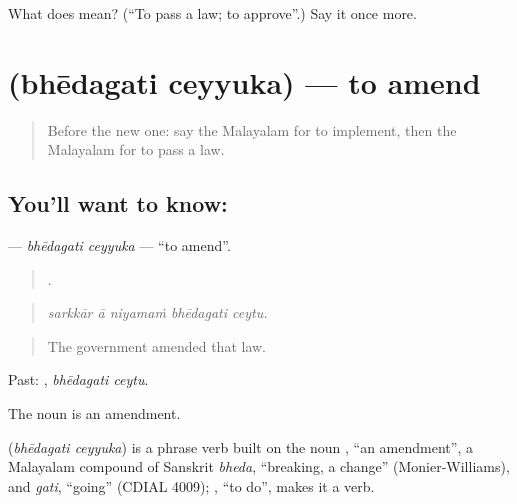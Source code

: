 \begin{tcolorbox}[breakable,colback=teal!4,colframe=teal!35!black,title={Before you move on}]
What does  mean? (\textquotedblleft{}To pass a law; to approve\textquotedblright{}.) Say it once more.
\end{tcolorbox}
\section[\texorpdfstring{\ml{ഭേദഗതി} \ml{ചെയ്യുക} (bhēdagati ceyyuka)}{ഭേദഗതി ചെയ്യുക (bhēdagati ceyyuka)}]{  (bhēdagati ceyyuka) — to amend}

\label{lesson:ML-C423-bhedagati-ceyyuka}



\begin{quote}
Before the new one: say the Malayalam for to implement, then the Malayalam for to pass a law.
\end{quote}

\subsection*{You'll want to know:  }
\textbf{ } — \emph{bhēdagati ceyyuka} — \textquotedblleft{}to amend\textquotedblright{}.

\begin{quote}
    .
\end{quote}

\begin{quote}
\emph{sarkkār ā niyamaṁ bhēdagati ceytu.}
\end{quote}

\begin{quote}
The government amended that law.
\end{quote}

Past:  , \emph{bhēdagati ceytu}.

The noun  is an amendment.

\begin{cousinweb}
\textbf{ } (\emph{bhēdagati ceyyuka}) is a phrase verb built on the noun , \textquotedblleft{}an amendment\textquotedblright{}, a Malayalam compound of Sanskrit \emph{bheda}, \textquotedblleft{}breaking, a change\textquotedblright{} (Monier-Williams), and \emph{gati}, \textquotedblleft{}going\textquotedblright{} (CDIAL 4009); , \textquotedblleft{}to do\textquotedblright{}, makes it a verb.
\end{cousinweb}

